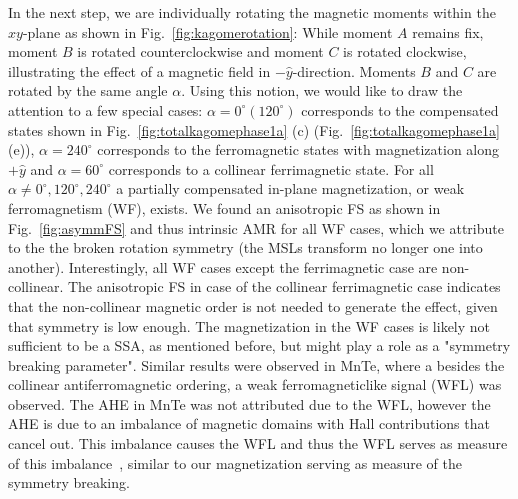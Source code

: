 \documentclass[prb,showpacs,amsmath,amssymb,superscriptaddress,twocolumn,floatfix]{revtex4-1}
\begin{document}
In the next step, we are individually rotating the magnetic moments
within the $xy$-plane as shown in Fig.~\ref{fig:kagomerotation}: While moment $A$ remains fix, moment $B$ is rotated counterclockwise and moment $C$ is rotated clockwise, illustrating the effect of a magnetic field in $-\hat{y}$-direction. Moments $B$ and $C$ are rotated by the same angle $\alpha$. Using this notion, we would like to draw the attention to a few special cases: $\alpha = 0^\circ (120^\circ)$ corresponds to the compensated states shown in Fig.~\ref{fig:totalkagomephase1a} (c) (Fig.~\ref{fig:totalkagomephase1a} (e)), $\alpha = 240^\circ$ corresponds to the ferromagnetic states with magnetization along $+\hat{y}$ and $\alpha = 60^\circ$ corresponds to a collinear ferrimagnetic state. For all $\alpha \neq 0^\circ, 120^\circ, 240^\circ$ a partially compensated in-plane magnetization, or weak ferromagnetism (WF), exists. We found an anisotropic FS as shown in Fig.~\ref{fig:asymmFS} and thus intrinsic AMR for all WF cases, which we attribute to the the broken rotation symmetry (the MSLs transform no longer one into another). Interestingly, all WF cases except the ferrimagnetic case are non-collinear. The anisotropic FS in case of the collinear ferrimagnetic case indicates that the {\color{red} non-collinear magnetic order is not needed to generate the effect, given that symmetry is low enough.} The magnetization in the WF cases is likely not sufficient to be a SSA, as mentioned before, but might play a role as a "symmetry breaking parameter". Similar results were observed in MnTe, where a besides the collinear antiferromagnetic ordering, a weak ferromagneticlike signal (WFL) was observed. The AHE in MnTe was not attributed due to the WFL, however the AHE is due to an imbalance of magnetic domains with Hall contributions that cancel out. This imbalance causes the WFL and thus the WFL serves as measure of this imbalance~\cite{Kluczyk:2024}, similar to our magnetization serving as measure of the symmetry breaking.
\end{document}
